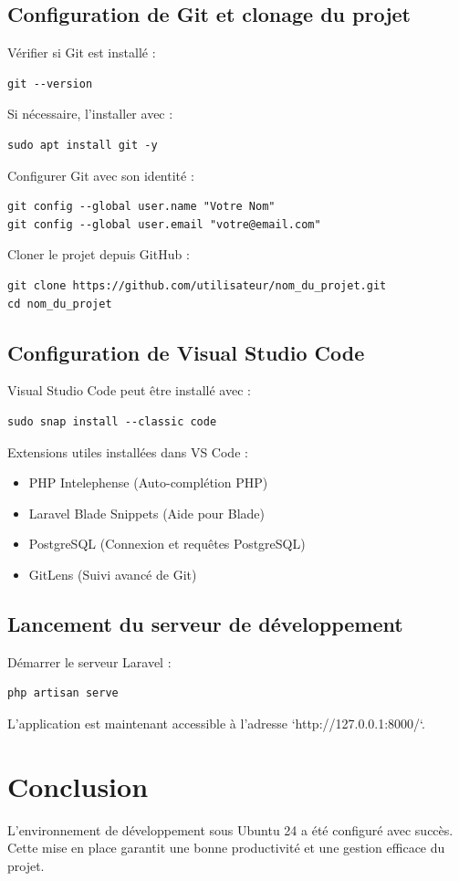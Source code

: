 \subsection{Configuration de Git et clonage du projet}
Vérifier si Git est installé :
\begin{verbatim}
git --version
\end{verbatim}
Si nécessaire, l’installer avec :
\begin{verbatim}
sudo apt install git -y
\end{verbatim}
Configurer Git avec son identité :
\begin{verbatim}
git config --global user.name "Votre Nom"
git config --global user.email "votre@email.com"
\end{verbatim}
Cloner le projet depuis GitHub :
\begin{verbatim}
git clone https://github.com/utilisateur/nom_du_projet.git
cd nom_du_projet
\end{verbatim}

\subsection{Configuration de Visual Studio Code}
Visual Studio Code peut être installé avec :
\begin{verbatim}
sudo snap install --classic code
\end{verbatim}
Extensions utiles installées dans VS Code :
\begin{itemize}
    \item PHP Intelephense (Auto-complétion PHP)
    \item Laravel Blade Snippets (Aide pour Blade)
    \item PostgreSQL (Connexion et requêtes PostgreSQL)
    \item GitLens (Suivi avancé de Git)
\end{itemize}

\subsection{Lancement du serveur de développement}
Démarrer le serveur Laravel :
\begin{verbatim}
php artisan serve
\end{verbatim}
L’application est maintenant accessible à l’adresse `http://127.0.0.1:8000/`.

\section{Conclusion}
L’environnement de développement sous Ubuntu 24 a été configuré avec succès. Cette mise en place garantit une bonne productivité et une gestion efficace du projet.




